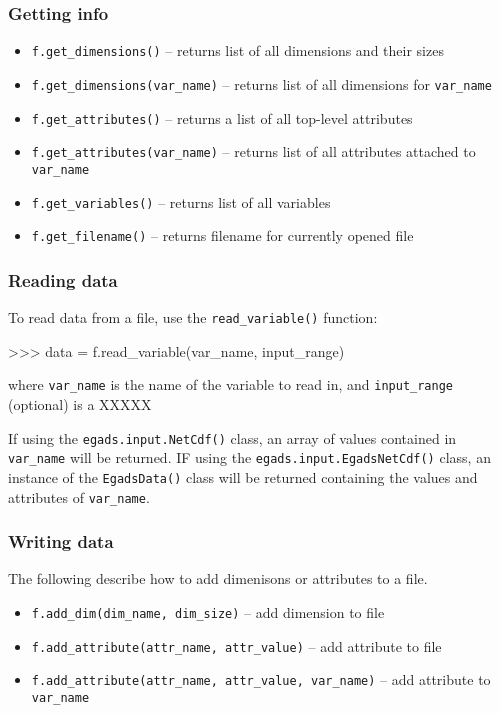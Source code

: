 \documentclass[a4paper,11pt]{report}
\begin{document}
\subsubsection{Getting info}

\begin{itemize}
\item \verb|f.get_dimensions()| -- returns list of all dimensions and their sizes
\item \verb|f.get_dimensions(var_name)| -- returns list of all dimensions for \verb|var_name|
\item \verb|f.get_attributes()| -- returns a list of all top-level attributes
\item \verb|f.get_attributes(var_name)| -- returns list of all attributes attached to \verb|var_name|
\item \verb|f.get_variables()| -- returns list of all variables
\item \verb|f.get_filename()| -- returns filename for currently opened file
\end{itemize}

\subsubsection{Reading data}

To read data from a file, use the \verb|read_variable()| function:

\begin{command}
    >>> data = f.read_variable(var_name, input_range)
\end{command}
where \verb|var_name| is the name of the variable to read in, and \verb|input_range| (optional) is a XXXXX

If using the \verb|egads.input.NetCdf()| class, an array of values contained in \verb|var_name| 
will be returned. IF using the \verb|egads.input.EgadsNetCdf()| class, an instance of the 
\verb|EgadsData()| class will be returned containing the values and attributes of \verb|var_name|.

\subsubsection{Writing data}

The following describe how to add dimenisons or attributes to a file.
\begin{itemize}
\item \verb|f.add_dim(dim_name, dim_size)| -- add dimension to file
\item \verb|f.add_attribute(attr_name, attr_value)| -- add attribute to file
\item \verb|f.add_attribute(attr_name, attr_value, var_name)| -- add attribute to \verb|var_name|
\end{itemize}
\end{document}
